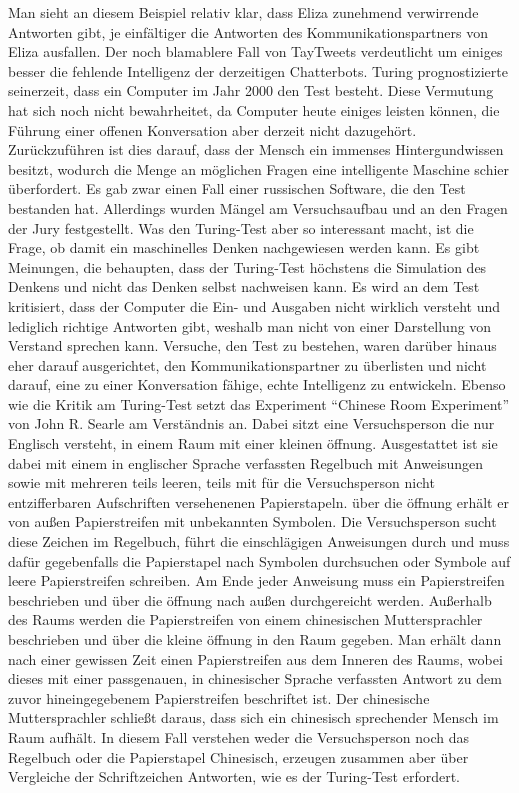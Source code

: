 Man sieht an diesem Beispiel relativ klar, dass Eliza zunehmend verwirrende Antworten gibt, je einfältiger die Antworten des Kommunikationspartners von Eliza ausfallen.
Der noch blamablere Fall von TayTweets verdeutlicht um einiges besser die fehlende Intelligenz der derzeitigen Chatterbots.
Turing prognostizierte seinerzeit, dass ein Computer im Jahr 2000 den Test besteht.
Diese Vermutung hat sich noch nicht bewahrheitet, da Computer heute einiges leisten können, die Führung einer offenen Konversation aber derzeit nicht dazugehört.
Zurückzuführen ist dies darauf, dass der Mensch ein immenses Hintergundwissen besitzt, wodurch die Menge an möglichen Fragen eine intelligente Maschine schier überfordert.
Es gab zwar einen Fall einer russischen Software, die den Test bestanden hat.
Allerdings wurden Mängel am Versuchsaufbau und an den Fragen der Jury festgestellt.
Was den Turing-Test aber so interessant macht, ist die Frage, ob damit ein maschinelles Denken nachgewiesen werden kann.
Es gibt Meinungen, die behaupten, dass der Turing-Test höchstens die Simulation des Denkens und nicht das Denken selbst nachweisen kann.
Es wird an dem Test kritisiert, dass der Computer die Ein- und Ausgaben nicht wirklich versteht und lediglich richtige Antworten gibt, weshalb man nicht von einer Darstellung von Verstand sprechen kann.
Versuche, den Test zu bestehen, waren darüber hinaus eher darauf ausgerichtet, den Kommunikationspartner zu überlisten und nicht darauf, eine zu einer Konversation fähige, echte Intelligenz zu entwickeln.
Ebenso wie die Kritik am Turing-Test setzt das Experiment “Chinese Room Experiment” von John R.
Searle am Verständnis an.
Dabei sitzt eine Versuchsperson die nur Englisch versteht, in einem Raum mit einer kleinen öffnung.
Ausgestattet ist sie dabei mit einem in englischer Sprache verfassten Regelbuch mit Anweisungen sowie mit mehreren teils leeren, teils mit für die Versuchsperson nicht entzifferbaren Aufschriften versehenenen Papierstapeln.
über die öffnung erhält er von außen Papierstreifen mit unbekannten Symbolen.
Die Versuchsperson sucht diese Zeichen im Regelbuch, führt die einschlägigen Anweisungen durch und muss dafür gegebenfalls die Papierstapel nach Symbolen durchsuchen oder Symbole auf leere Papierstreifen schreiben.
Am Ende jeder Anweisung muss ein Papierstreifen beschrieben und über die öffnung nach außen durchgereicht werden.
Außerhalb des Raums werden die Papierstreifen von einem chinesischen Muttersprachler beschrieben und über die kleine öffnung in den Raum gegeben.
Man erhält dann nach einer gewissen Zeit einen Papierstreifen aus dem Inneren des Raums, wobei dieses mit einer passgenauen, in chinesischer Sprache verfassten Antwort zu dem zuvor hineingegebenem Papierstreifen beschriftet ist.
Der chinesische Muttersprachler schließt daraus, dass sich ein chinesisch sprechender Mensch im Raum aufhält.
In diesem Fall verstehen weder die Versuchsperson noch das Regelbuch oder die Papierstapel Chinesisch, erzeugen zusammen aber über Vergleiche der Schriftzeichen Antworten, wie es der Turing-Test erfordert.

